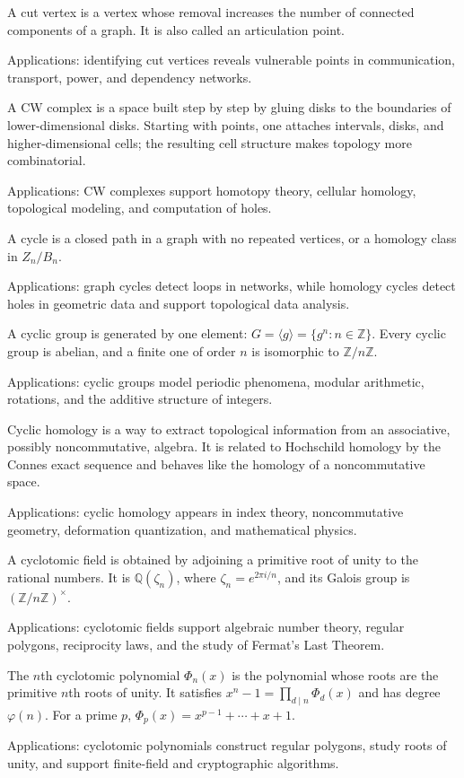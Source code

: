 A cut vertex is a vertex whose removal increases the number of connected components of a graph. It is also called an articulation point. \par\noindent Applications: identifying cut vertices reveals vulnerable points in communication, transport, power, and dependency networks.

A CW complex is a space built step by step by gluing disks to the boundaries of lower-dimensional disks. Starting with points, one attaches intervals, disks, and higher-dimensional cells; the resulting cell structure makes topology more combinatorial. \par\noindent Applications: CW complexes support homotopy theory, cellular homology, topological modeling, and computation of holes.

A cycle is a closed path in a graph with no repeated vertices, or a homology class in $Z_n/B_n$. \par\noindent Applications: graph cycles detect loops in networks, while homology cycles detect holes in geometric data and support topological data analysis.

A cyclic group is generated by one element: $G=\langle g\rangle=\{g^n:n\in\mathbb Z\}$. Every cyclic group is abelian, and a finite one of order $n$ is isomorphic to $\mathbb Z/n\mathbb Z$. \par\noindent Applications: cyclic groups model periodic phenomena, modular arithmetic, rotations, and the additive structure of integers.

Cyclic homology is a way to extract topological information from an associative, possibly noncommutative, algebra. It is related to Hochschild homology by the Connes exact sequence and behaves like the homology of a noncommutative space. \par\noindent Applications: cyclic homology appears in index theory, noncommutative geometry, deformation quantization, and mathematical physics.

A cyclotomic field is obtained by adjoining a primitive root of unity to the rational numbers. It is $\mathbb Q(\zeta_n)$, where $\zeta_n=e^{2\pi i/n}$, and its Galois group is $(\mathbb Z/n\mathbb Z)^\times$. \par\noindent Applications: cyclotomic fields support algebraic number theory, regular polygons, reciprocity laws, and the study of Fermat's Last Theorem.

The $n$th cyclotomic polynomial $\Phi_n(x)$ is the polynomial whose roots are the primitive $n$th roots of unity. It satisfies $x^n-1=\prod_{d\mid n}\Phi_d(x)$ and has degree $\varphi(n)$. For a prime $p$, $\Phi_p(x)=x^{p-1}+\cdots+x+1$. \par\noindent Applications: cyclotomic polynomials construct regular polygons, study roots of unity, and support finite-field and cryptographic algorithms.

